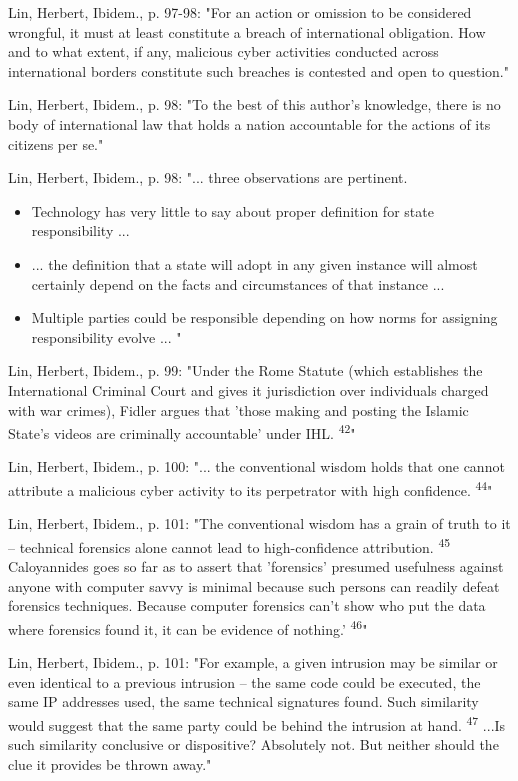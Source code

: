 Lin, Herbert, Ibidem., p. 97-98: "For an action or omission to be considered wrongful, it must at least constitute a breach of international obligation. How and to what extent, if any, malicious cyber activities conducted across international borders constitute such breaches is contested and open to question."

Lin, Herbert, Ibidem., p. 98: "To the best of this author's knowledge, there is no body of international law that holds a nation accountable for the actions of its citizens per se."

Lin, Herbert, Ibidem., p. 98: "... three observations are pertinent. \begin{itemize} \item Technology has very little to say about proper definition for state responsibility ... \item ... the definition that a state will adopt in any given instance will almost certainly depend on the facts and circumstances of that instance ... \item Multiple parties could be responsible depending on how norms for assigning responsibility evolve ... " \end{itemize}

Lin, Herbert, Ibidem., p. 99: "Under the Rome Statute (which establishes the International Criminal Court and gives it jurisdiction over individuals charged with war crimes), Fidler argues that 'those making and posting the Islamic State's videos are criminally accountable' under IHL. \textsuperscript{42}"

Lin, Herbert, Ibidem., p. 100: "... the conventional wisdom holds that one cannot attribute a malicious cyber activity to its perpetrator with high confidence. \textsuperscript{44}"

Lin, Herbert, Ibidem., p. 101: "The conventional wisdom has a grain of truth to it -- technical \gls{forensics} alone cannot lead to high-confidence attribution. \textsuperscript{45} Caloyannides goes so far as to assert that '\gls{forensics}' presumed usefulness against anyone with computer savvy is minimal because such persons can readily defeat \gls{forensics} techniques. Because computer \gls{forensics} can't show who put the data where \gls{forensics} found it, it can be evidence of nothing.' \textsuperscript{46}"

Lin, Herbert, Ibidem., p. 101: "For example, a given intrusion may be similar or even identical to a previous intrusion -- the same code could be executed, the same IP addresses used, the same technical signatures found. Such similarity would suggest that the same party could be behind the intrusion at hand. \textsuperscript{47} ...Is such similarity conclusive or dispositive? Absolutely not. But neither should the clue it provides be thrown away."

